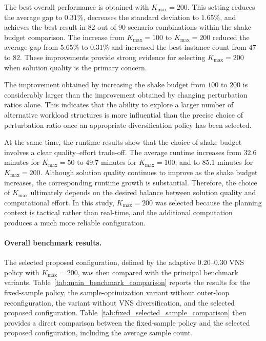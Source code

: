 The best overall performance is obtained with \(K_{\max}=200\). This setting reduces the average gap to \(0.31\%\), decreases the standard deviation to \(1.65\%\), and achieves the best result in \(82\) out of \(90\) scenario combinations within the shake-budget comparison. The increase from \(K_{\max}=100\) to \(K_{\max}=200\) reduced the average gap from \(5.65\%\) to \(0.31\%\) and increased the best-instance count from \(47\) to \(82\). These improvements provide strong evidence for selecting \(K_{\max}=200\) when solution quality is the primary concern.

The improvement obtained by increasing the shake budget from \(100\) to \(200\) is considerably larger than the improvement obtained by changing perturbation ratios alone. This indicates that the ability to explore a larger number of alternative workload structures is more influential than the precise choice of perturbation ratio once an appropriate diversification policy has been selected.

At the same time, the runtime results show that the choice of shake budget involves a clear quality--effort trade-off. The average runtime increases from \(32.6\) minutes for \(K_{\max}=50\) to \(49.7\) minutes for \(K_{\max}=100\), and to \(85.1\) minutes for \(K_{\max}=200\). Although solution quality continues to improve as the shake budget increases, the corresponding runtime growth is substantial. Therefore, the choice of \(K_{\max}\) ultimately depends on the desired balance between solution quality and computational effort. In this study, \(K_{\max}=200\) was selected because the planning context is tactical rather than real-time, and the additional computation produces a much more reliable configuration.

\paragraph{Overall benchmark results.}

The selected proposed configuration, defined by the adaptive \(0.20\)--\(0.30\) VNS policy with \(K_{\max}=200\), was then compared with the principal benchmark variants. Table~\ref{tab:main_benchmark_comparison} reports the results for the fixed-sample policy, the sample-optimization variant without outer-loop reconfiguration, the variant without VNS diversification, and the selected proposed configuration. Table~\ref{tab:fixed_selected_sample_comparison} then provides a direct comparison between the fixed-sample policy and the selected proposed configuration, including the average sample count.

